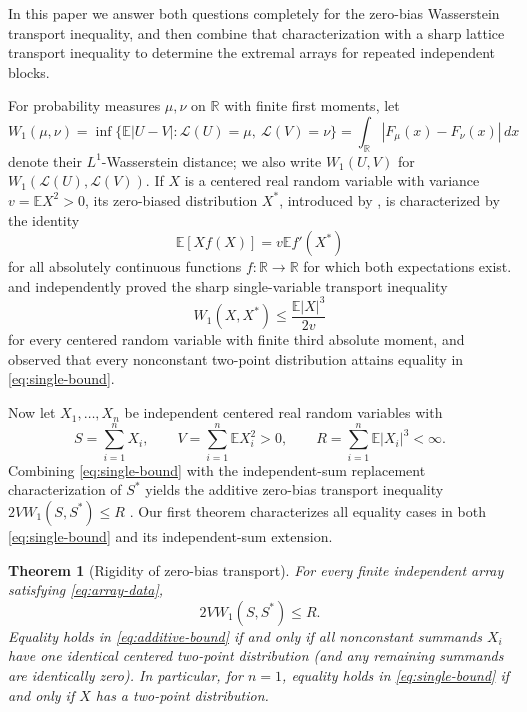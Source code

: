 \documentclass[11pt]{article}
\numberwithin{equation}{section}
\newtheorem{theorem}{Theorem}[section]
\theoremstyle{remark}
\newcommand{\E}{\mathbb E}
\newcommand{\R}{\mathbb R}
\newcommand{\Law}{\mathcal L}
\begin{document}
In this paper we answer both questions completely for the zero-bias
Wasserstein transport inequality, and then combine that characterization with
a sharp lattice transport inequality to determine the extremal arrays for
repeated independent blocks.

For probability measures $\mu,\nu$ on $\R$ with finite first moments, let
\[
 W_1(\mu,\nu)=\inf\{\E|U-V|:\Law(U)=\mu,\ \Law(V)=\nu\}
             =\int_\R|F_\mu(x)-F_\nu(x)|\,dx
\]
denote their $L^1$-Wasserstein distance; we also write $W_1(U,V)$ for
$W_1(\Law(U),\Law(V))$. If $X$ is a centered real random variable with
variance $v=\E X^2>0$, its zero-biased distribution $X^*$, introduced by
\citet[Definition~1.1 and Lemma~2.1]{GoldsteinReinert1997}, is characterized
by the identity
\begin{equation}\label{eq:zero-bias}
             \E[Xf(X)]=v\E f'(X^*)
\end{equation}
for all absolutely continuous functions $f:\R\to\R$ for which both
expectations exist.
\citet[Lemma~1.1]{Goldstein2010} and \citet[Theorem~3]{Tyurin2009}
independently proved the sharp single-variable transport inequality
\begin{equation}\label{eq:single-bound}
 W_1(X,X^*)\le\frac{\E|X|^3}{2v}
\end{equation}
for every centered random variable with finite third absolute moment, and
observed that every nonconstant two-point distribution attains equality in
\eqref{eq:single-bound}.

Now let $X_1,\ldots,X_n$ be independent centered real random variables with
\begin{equation}\label{eq:array-data}
 S=\sum_{i=1}^nX_i,\qquad
 V=\sum_{i=1}^n\E X_i^2>0,\qquad
 R=\sum_{i=1}^n\E|X_i|^3<\infty.
\end{equation}
Combining \eqref{eq:single-bound} with the independent-sum replacement
characterization of $S^*$ yields the additive zero-bias transport inequality
$2VW_1(S,S^*)\le R$ \citep[Corollary~1]{Tyurin2009}. Our first theorem
characterizes all equality cases in both \eqref{eq:single-bound} and its
independent-sum extension.

\begin{theorem}[Rigidity of zero-bias transport]\label{thm:array-equality}
For every finite independent array satisfying \eqref{eq:array-data},
\begin{equation}\label{eq:additive-bound}
                      2V W_1(S,S^*)\le R.
\end{equation}
Equality holds in \eqref{eq:additive-bound} if and only if all nonconstant
summands $X_i$ have one identical centered two-point distribution (and any
remaining summands are identically zero). In particular, for $n=1$, equality
holds in \eqref{eq:single-bound} if and only if $X$ has a two-point
distribution.
\end{theorem}
\end{document}

